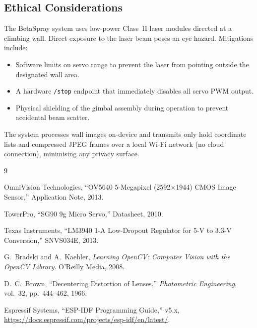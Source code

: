 \documentclass[12pt]{article}
\begin{document}
\subsection{Ethical Considerations}

The BetaSpray system uses low-power Class~II laser modules directed at a
climbing wall.  Direct exposure to the laser beam poses an eye hazard.  Mitigations
include:

\begin{itemize}
  \item Software limits on servo range to prevent the laser from pointing
        outside the designated wall area.
  \item A hardware \texttt{/stop} endpoint that immediately disables all servo
        PWM output.
  \item Physical shielding of the gimbal assembly during operation to prevent
        accidental beam scatter.
\end{itemize}

The system processes wall images on-device and transmits only hold coordinate
lists and compressed JPEG frames over a local Wi-Fi network (no cloud
connection), minimising any privacy surface.

\begin{thebibliography}{9}

OmniVision Technologies, ``OV5640 5-Megapixel (2592$\times$1944) CMOS Image
Sensor,'' Application Note, 2013.

TowerPro, ``SG90 9g Micro Servo,'' Datasheet, 2010.

Texas Instruments, ``LM3940 1-A Low-Dropout Regulator for 5-V to 3.3-V
Conversion,'' SNVS034E, 2013.

G.~Bradski and A.~Kaehler, \textit{Learning OpenCV: Computer Vision with the
OpenCV Library}. O'Reilly Media, 2008.

D.~C.~Brown, ``Decentering Distortion of Lenses,'' \textit{Photometric
Engineering}, vol.~32, pp.~444--462, 1966.

Espressif Systems, ``ESP-IDF Programming Guide,'' v5.x,
\url{https://docs.espressif.com/projects/esp-idf/en/latest/}.

\end{thebibliography}
\end{document}
